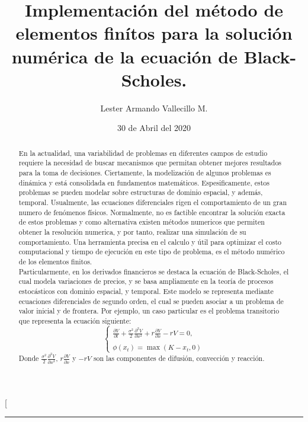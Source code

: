 \documentclass[12pt]{article}
\begin{document}
\title{Implementación del método de elementos finítos para la solución numérica de la ecuación de Black-Scholes.}
\author{Lester Armando Vallecillo M.}

\date{30 de Abril del 2020}

\twocolumn[
\begin{@twocolumnfalse}
\maketitle
\vspace*{-0.8cm}
\begin{center}\rule{0.9\textwidth}{0.1mm} \end{center}
\begin{abstract}
\normalsize

En la actualidad, una variabilidad de problemas en diferentes campos de estudio requiere la necesidad de buscar mecanismos que permitan obtener mejores resultados para la toma de decisiones. Ciertamente, la modelización de algunos problemas es dinámica y está consolidada en fundamentos matemáticos. Espesificamente, estos problemas se pueden modelar sobre estructuras de dominio espacial, y además, temporal. Usualmente, las ecuaciones diferenciales rigen el comportamiento de un gran numero de fenómenos físicos. Normalmente, no es factible encontrar la solución exacta de estos problemas y como alternativa existen métodos numericos que permiten obtener la resolución numerica, y por tanto, realizar una simulación de su comportamiento. Una herramienta precisa en el calculo y útil para optimizar el costo computacional y tiempo de ejecución en este tipo de problema, es el método numérico de los elementos finitos.\\ 

Particularmente, en los derivados financieros se destaca la ecuación de Black-Scholes, el cual modela variaciones de precios, y se basa ampliamente en la teoría de procesos estocásticos con dominio espacial, y temporal. Este modelo se representa mediante ecuaciones diferenciales de segundo orden, el cual se pueden asociar a un problema de valor inicial y de frontera. Por ejemplo, un caso particular es el problema transitorio que representa la ecuación siguiente: 
\begin{equation*} 
\left\{
\begin{array}{c}
\frac{\partial{V}}{\partial{t}} + \frac{{\sigma}^2}{2}\frac{\partial^2{V}}{\partial{x^2}}
+ r\frac{\partial{V}}{\partial{x}}-rV=0,\\ \\
\phi(x_t) = \max{(K-x_t,0)} 
\end{array} \right.
\end{equation*}
Donde $ \frac{{\sigma}^2}{2}\frac{\partial^2{V}}{\partial{x^2}}$, $r\frac{\partial V}{\partial x}$ y $-rV$ son las componentes de difusión, convección y reacción.\\


\end{abstract}
\end{@twocolumnfalse}
\end{document}
